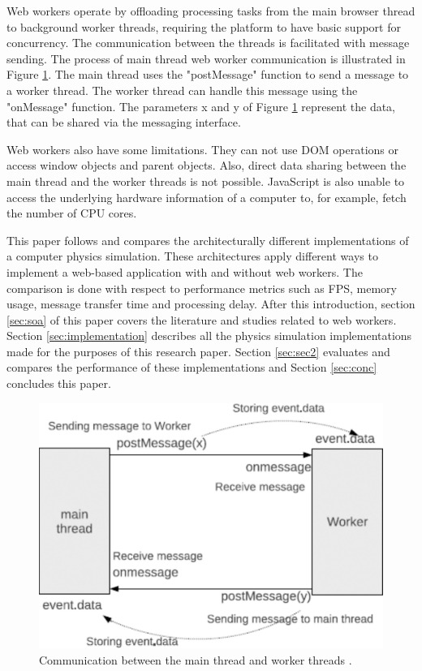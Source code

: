 \documentclass[conference, 9pt]{IEEEtran}
\begin{document}
Web workers operate by offloading processing tasks from the main browser thread to background worker threads, requiring the platform to have basic support for concurrency. 
The communication between the threads is facilitated with message sending. The process of main thread web worker communication is illustrated in Figure \ref{fig:figure1}. 
The main thread uses the "postMessage" function to send a message to a worker thread. The worker thread can handle this message using the "onMessage" function. The parameters x and y of Figure \ref{fig:figure1} represent the data, that can be shared via the messaging interface. \cite{doha, watanabe}

Web workers also have some limitations. They can not use DOM operations or access window objects and parent objects. Also, direct data sharing between the main thread and 
the worker threads is not possible. JavaScript is also unable to access the underlying hardware information of a computer to, for example, fetch the number of CPU cores. \cite{watanabe, verdu}

This paper follows and compares the architecturally different implementations of a computer physics simulation. These architectures apply different ways to implement a 
web-based application with and without web workers. The comparison is done with respect to performance metrics such as FPS, memory usage, message transfer time and processing delay. After this introduction, section \ref{sec:soa} of this paper covers the literature and studies related to web workers. Section \ref{sec:implementation} describes all the
physics simulation implementations made for the purposes of this research paper. Section \ref{sec:sec2} evaluates and compares the performance of these implementations and
Section \ref{sec:conc} concludes this paper.

\begin{figure}[ht]
	\centering
	\includegraphics[scale=0.25]{figs/figure1.png}
	\caption{Communication between the main thread and worker threads \cite{watanabe}.}
	\label{fig:figure1}
\end{figure}
\end{document}
